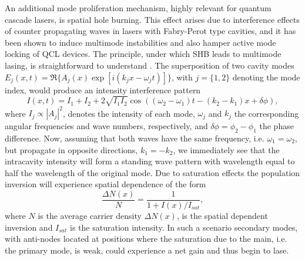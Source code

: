 \documentclass[journal]{IEEEtran}
\begin{document}
	
	An additional mode proliferation mechanism, highly relevant for quantum cascade lasers, is spatial hole burning. This effect arises due to interference effects of counter propagating waves in lasers with Fabry-Perot type cavities, and it has been shown \cite{wang2007coherent,gordon2008multimode,gkortsas2010dynamics} to induce multimode instabilities and also hamper active mode locking of QCL devices. The principle, under which SHB leads to multimode lasing, is straightforward to understand \cite{siegman1986lasers}. The superposition of two cavity modes  $E_j(x,t) = \Re\{A_j(x)\exp[i(k_jx-\omega_jt)]\}$, with $j =\{1,2\}$ denoting the mode index, would produce an intensity interference pattern 
	\begin{equation}
	\label{eq:interference-effect}
	I(x,t) = I_1+I_2+2\sqrt{I_1I_2}\cos((\omega_2-\omega_1)t-(k_2-k_1)x+\delta\phi),
	\end{equation}
	where $I_j \propto |A_j|^2$, denotes the intensity of each mode, $\omega_j$ and $k_j$ the corresponding angular frequencies and wave numbers, respectively, and $\delta\phi = \phi_2-\phi_1$ the phase difference. Now, assuming that both waves have the same frequency, i.e. $\omega_1 =\omega_2$, but propagate in opposite directions, $k_1 = -k_2$, we immediately see that the intracavity intensity will form a standing wave pattern with wavelength equal to half the wavelength of the original mode. Due to saturation effects the population inversion will experience spatial dependence of the form 
	\begin{equation}
	\frac{\Delta N(x)}{N} = \frac{1}{1+I(x)/I_{sat}}, 
	\end{equation}
	where $N$ is the average carrier density $\Delta N(x)$, is the spatial dependent inversion and $I_{sat}$ is the saturation intensity. In such a scenario secondary modes, with anti-nodes located at positions where the saturation due to the main, i.e. the primary mode, is weak, could experience a net gain and thus begin to lase. 
	
\end{document}
